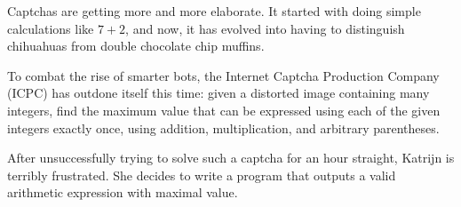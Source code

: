 

%
Captchas are getting more and more elaborate.
It started with doing simple calculations like $7 + 2$, and now, it has evolved into having to distinguish chihuahuas from double chocolate chip muffins.

To combat the rise of smarter bots, the Internet Captcha Production Company (ICPC) has outdone itself this time:
given a distorted image containing many integers, find the maximum value that can be expressed using each of the given integers exactly once, using addition, multiplication, and arbitrary parentheses.

After unsuccessfully trying to solve such a captcha for an hour straight, Katrijn is terribly frustrated.
She decides to write a program that outputs a valid arithmetic expression with maximal value.

